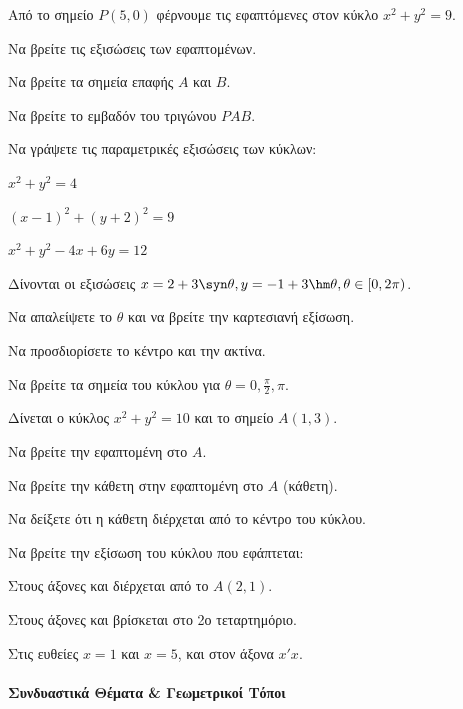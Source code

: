 \documentclass[11pt,a4paper,modern]{FFExercises}
\begin{document}
\askhsh
Από το σημείο $P(5,0)$ φέρνουμε τις εφαπτόμενες στον κύκλο $x^2 + y^2 = 9$.
\begin{alist}
    \item Να βρείτε τις εξισώσεις των εφαπτομένων.
    \item Να βρείτε τα σημεία επαφής $A$ και $B$.
    \item Να βρείτε το εμβαδόν του τριγώνου $PAB$.
\end{alist}

\askhsh
Να γράψετε τις παραμετρικές εξισώσεις των κύκλων:
\begin{alist}
    \item $x^2 + y^2 = 4$
    \item $(x-1)^2 + (y+2)^2 = 9$
    \item $x^2 + y^2 - 4x + 6y = 12$
\end{alist}

\askhsh
Δίνονται οι εξισώσεις $x = 2 + 3\syn\theta, y = -1 + 3\hm\theta, \theta \in [0, 2\pi)$.
\begin{alist}
    \item Να απαλείψετε το $\theta$ και να βρείτε την καρτεσιανή εξίσωση.
    \item Να προσδιορίσετε το κέντρο και την ακτίνα.
    \item Να βρείτε τα σημεία του κύκλου για $\theta = 0, \frac{\pi}{2}, \pi$.
\end{alist}

\askhsh
Δίνεται ο κύκλος $x^2+y^2=10$ και το σημείο $A(1,3)$.
\begin{alist}
    \item Να βρείτε την εφαπτομένη στο $A$.
    \item Να βρείτε την κάθετη στην εφαπτομένη στο $A$ (κάθετη).
    \item Να δείξετε ότι η κάθετη διέρχεται από το κέντρο του κύκλου.
\end{alist}

\askhsh
Να βρείτε την εξίσωση του κύκλου που εφάπτεται:
\begin{alist}
    \item Στους άξονες και διέρχεται από το $A(2,1)$.
    \item Στους άξονες και βρίσκεται στο 2ο τεταρτημόριο.
    \item Στις ευθείες $x=1$ και $x=5$, και στον άξονα $x'x$.
\end{alist}


\paragraph{Συνδυαστικά Θέματα \& Γεωμετρικοί Τόποι}
\end{document}

